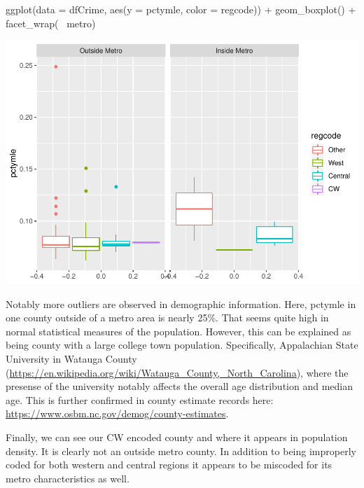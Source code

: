 \documentclass[]{article}
\newenvironment{Shaded}{}{}
\newcommand{\DataTypeTok}[1]{#1}
\newcommand{\KeywordTok}[1]{\textcolor[rgb]{0.00,0.00,1.00}{#1}}
\newcommand{\NormalTok}[1]{#1}
\newcommand{\OperatorTok}[1]{#1}
\newcommand{\StringTok}[1]{\textcolor[rgb]{0.00,0.50,0.50}{#1}}
\begin{document}
\begin{Shaded}
\begin{Highlighting}[]
\KeywordTok{ggplot}\NormalTok{(}\DataTypeTok{data =}\NormalTok{ dfCrime, }\KeywordTok{aes}\NormalTok{(}\DataTypeTok{y =}\NormalTok{ pctymle, }\DataTypeTok{color =}\NormalTok{ regcode)) }\OperatorTok{+}\StringTok{ }
\StringTok{      }\KeywordTok{geom_boxplot}\NormalTok{() }\OperatorTok{+}\StringTok{ }\KeywordTok{facet_wrap}\NormalTok{(}\OperatorTok{~}\StringTok{ }\NormalTok{metro)}
\end{Highlighting}
\end{Shaded}

\includegraphics{Bagnard_Gaustad_Hartman_Leung_Lab_3_files/figure-latex/unnamed-chunk-27-3.pdf}

Notably more outliers are observed in demographic information. Here,
pctymle in one county outside of a metro area is nearly 25\%. That seems
quite high in normal statistical measures of the population. However,
this can be explained as being county with a large college town
population. Specifically, Appalachian State University in Watauga County
(\url{https://en.wikipedia.org/wiki/Watauga_County,_North_Carolina}),
where the presense of the university notably affects the overall age
distribution and median age. This is further confirmed in county
estimate records here:
\url{https://www.osbm.nc.gov/demog/county-estimates}.

Finally, we can see our CW encoded county and where it appears in
population density. It is clearly not an outside metro county. In
addition to being improperly coded for both western and central regions
it appears to be miscoded for its metro characteristics as well.
\end{document}
